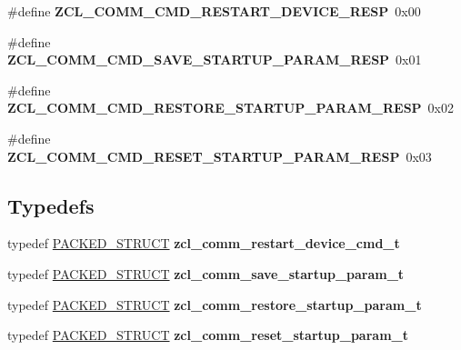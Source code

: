 \begin{DoxyCompactItemize}
\item 
\hypertarget{group__zcl__commissioning_gaaa66ad63e343d1e240de1c7ddb756252}{\#define {\bfseries Z\-C\-L\-\_\-\-C\-O\-M\-M\-\_\-\-C\-M\-D\-\_\-\-R\-E\-S\-T\-A\-R\-T\-\_\-\-D\-E\-V\-I\-C\-E\-\_\-\-R\-E\-S\-P}~0x00}\label{group__zcl__commissioning_gaaa66ad63e343d1e240de1c7ddb756252}

\item 
\hypertarget{group__zcl__commissioning_ga8fe85768360779f35242575201dee3a1}{\#define {\bfseries Z\-C\-L\-\_\-\-C\-O\-M\-M\-\_\-\-C\-M\-D\-\_\-\-S\-A\-V\-E\-\_\-\-S\-T\-A\-R\-T\-U\-P\-\_\-\-P\-A\-R\-A\-M\-\_\-\-R\-E\-S\-P}~0x01}\label{group__zcl__commissioning_ga8fe85768360779f35242575201dee3a1}

\item 
\hypertarget{group__zcl__commissioning_gab63c0df9d3243bd75d1672e635de781e}{\#define {\bfseries Z\-C\-L\-\_\-\-C\-O\-M\-M\-\_\-\-C\-M\-D\-\_\-\-R\-E\-S\-T\-O\-R\-E\-\_\-\-S\-T\-A\-R\-T\-U\-P\-\_\-\-P\-A\-R\-A\-M\-\_\-\-R\-E\-S\-P}~0x02}\label{group__zcl__commissioning_gab63c0df9d3243bd75d1672e635de781e}

\item 
\hypertarget{group__zcl__commissioning_gaf1e51dad8a536ed567cf7e15bd30d6c9}{\#define {\bfseries Z\-C\-L\-\_\-\-C\-O\-M\-M\-\_\-\-C\-M\-D\-\_\-\-R\-E\-S\-E\-T\-\_\-\-S\-T\-A\-R\-T\-U\-P\-\_\-\-P\-A\-R\-A\-M\-\_\-\-R\-E\-S\-P}~0x03}\label{group__zcl__commissioning_gaf1e51dad8a536ed567cf7e15bd30d6c9}

\end{DoxyCompactItemize}
\subsection*{Typedefs}
\begin{DoxyCompactItemize}
\item 
typedef \hyperlink{group___s_x_a_ga4233297bd31be5c273d4fb0758cc54d7}{P\-A\-C\-K\-E\-D\-\_\-\-S\-T\-R\-U\-C\-T} {\bfseries zcl\-\_\-comm\-\_\-restart\-\_\-device\-\_\-cmd\-\_\-t}
\item 
typedef \hyperlink{group___s_x_a_ga4233297bd31be5c273d4fb0758cc54d7}{P\-A\-C\-K\-E\-D\-\_\-\-S\-T\-R\-U\-C\-T} {\bfseries zcl\-\_\-comm\-\_\-save\-\_\-startup\-\_\-param\-\_\-t}
\item 
typedef \hyperlink{group___s_x_a_ga4233297bd31be5c273d4fb0758cc54d7}{P\-A\-C\-K\-E\-D\-\_\-\-S\-T\-R\-U\-C\-T} {\bfseries zcl\-\_\-comm\-\_\-restore\-\_\-startup\-\_\-param\-\_\-t}
\item 
typedef \hyperlink{group___s_x_a_ga4233297bd31be5c273d4fb0758cc54d7}{P\-A\-C\-K\-E\-D\-\_\-\-S\-T\-R\-U\-C\-T} {\bfseries zcl\-\_\-comm\-\_\-reset\-\_\-startup\-\_\-param\-\_\-t}
\end{DoxyCompactItemize}
